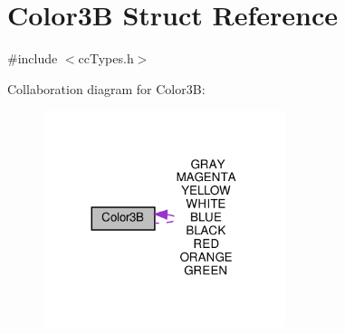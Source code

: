 \hypertarget{structColor3B}{}\section{Color3B Struct Reference}
\label{structColor3B}


{\ttfamily \#include $<$cc\+Types.\+h$>$}



Collaboration diagram for Color3B\+:
\nopagebreak
\begin{figure}[H]
\begin{center}
\leavevmode
\includegraphics[width=200pt]{structColor3B__coll__graph}
\end{center}
\end{figure}
